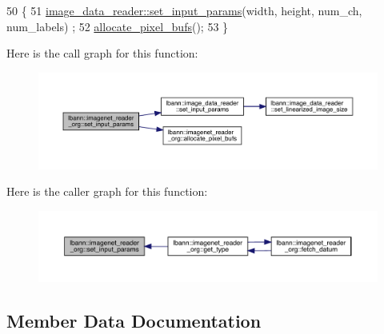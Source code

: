 \begin{DoxyCode}
50                                                                                                            
               \{
51   \hyperlink{classlbann_1_1image__data__reader_a6ed9b8b12ad3ffa93ad458d872f8c044}{image\_data\_reader::set\_input\_params}(width, height, num\_ch, num\_labels)
      ;
52   \hyperlink{classlbann_1_1imagenet__reader__org_acbe8ed442b64a7391ffa63b0658641c0}{allocate\_pixel\_bufs}();
53 \}
\end{DoxyCode}
Here is the call graph for this function\+:\nopagebreak
\begin{figure}[H]
\begin{center}
\leavevmode
\includegraphics[width=350pt]{classlbann_1_1imagenet__reader__org_afb843084789c6a12e01a5d4a687003cf_cgraph}
\end{center}
\end{figure}
Here is the caller graph for this function\+:\nopagebreak
\begin{figure}[H]
\begin{center}
\leavevmode
\includegraphics[width=350pt]{classlbann_1_1imagenet__reader__org_afb843084789c6a12e01a5d4a687003cf_icgraph}
\end{center}
\end{figure}


\subsection{Member Data Documentation}
\mbox{\label{classlbann_1_1imagenet__reader__org_ad594a338f0ef9614b63a1950254eb034}} 
